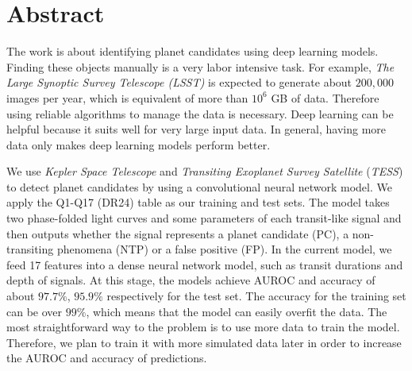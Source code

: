 \cleardoublepage
\chapter*{Abstract}
  \doublespacing
  \noindent The work is about identifying planet candidates using deep learning models.
  Finding these objects manually is a very labor intensive task.
  For example, \textit{The Large
      Synoptic Survey Telescope (LSST)} is expected to generate about
  $200,000$ images per year, which is equivalent of more than
  $10^{6}$ GB of data. Therefore using reliable algorithms to
  manage the data is necessary. Deep learning can be helpful
  because it suits well for very large input data. In general,
  having more data only makes deep learning models perform better.
  
  \vspace{\baselineskip}
  
  \noindent We use \textit{Kepler Space Telescope} and
  \textit{Transiting Exoplanet Survey Satellite} (\textit{TESS})
  to detect planet candidates by using a convolutional neural
  network model. We apply the Q1-Q17 (DR24) table as our training
  and test sets. The model takes
  two phase-folded light curves and some parameters of each transit-like signal
  and then outputs whether the signal represents a planet candidate (PC), 
  a non-transiting phenomena (NTP) or a false positive (FP).
  In the current model, we feed 17 features into a dense neural network
  model, such as transit durations and depth of signals.
  At this stage, the models achieve AUROC and accuracy
  of about $97.7\%$, $95.9\%$ respectively for the test set.
  The accuracy for the training set can be over $99\%$, which means that
  the model can easily overfit the data. The most straightforward way to the
  problem is to use more data to train the model.
  Therefore, we plan to train it with more simulated data later in order to
  increase the AUROC and accuracy of predictions.
			
